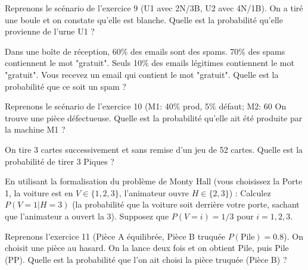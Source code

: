 \begin{exercicebox}
Reprenons le scénario de l'exercice 9 (U1 avec 2N/3B, U2 avec 4N/1B).
On a tiré une boule et on constate qu'elle est blanche. Quelle est la probabilité qu'elle provienne de l'urne U1 ?
\end{exercicebox}

\begin{exercicebox}
Dans une boîte de réception, 60\% des emails sont des spams. 70\% des spams contiennent le mot "gratuit". Seuls 10\% des emails légitimes contiennent le mot "gratuit".
Vous recevez un email qui contient le mot "gratuit". Quelle est la probabilité que ce soit un spam ?
\end{exercicebox}

\begin{exercicebox}
Reprenons le scénario de l'exercice 10 (M1: 40\% prod, 5\% défaut; M2: 60%
On trouve une pièce défectueuse. Quelle est la probabilité qu'elle ait été produite par la machine M1 ?
\end{exercicebox}


\begin{exercicebox}
On tire 3 cartes successivement et sans remise d'un jeu de 52 cartes.
Quelle est la probabilité de tirer 3 Piques ?
\end{exercicebox}

\begin{exercicebox}
En utilisant la formalisation du problème de Monty Hall (vous choisissez la Porte 1, la voiture est en $V \in \{1, 2, 3\}$, l'animateur ouvre $H \in \{2, 3\}$) :
Calculez $P(V=1 | H=3)$ (la probabilité que la voiture soit derrière votre porte, sachant que l'animateur a ouvert la 3). Supposez que $P(V=i)=1/3$ pour $i=1,2,3$.
\end{exercicebox}

\begin{exercicebox}
Reprenons l'exercice 11 (Pièce A équilibrée, Pièce B truquée $P(\text{Pile})=0.8$).
On choisit une pièce au hasard. On la lance deux fois et on obtient Pile, puis Pile (PP).
Quelle est la probabilité que l'on ait choisi la pièce truquée (Pièce B) ?
\end{exercicebox}

